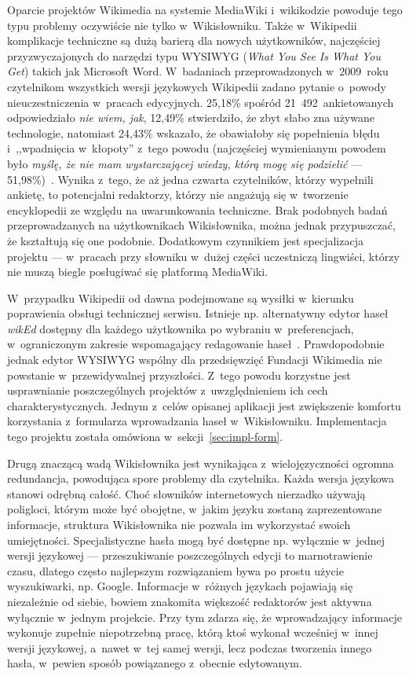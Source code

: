 Oparcie projektów Wikimedia na systemie MediaWiki i~wikikodzie powoduje tego typu problemy oczywiście nie tylko w~Wikisłowniku. Także w~Wikipedii komplikacje techniczne są dużą barierą dla nowych użytkowników, najczęściej przyzwyczajonych do narzędzi typu WYSIWYG (\emph{What You See Is What You Get}) takich jak Microsoft Word. W~badaniach przeprowadzonych w~2009~roku czytelnikom wszystkich wersji językowych Wikipedii zadano pytanie o~powody nieuczestniczenia w~pracach edycyjnych. 25,18\% spośród 21~492~ankietowanych odpowiedziało \emph{nie wiem, jak}, 12,49\% stwierdziło, że zbyt słabo zna używane technologie, natomiast 24,43\% wskazało, że obawiałoby się popełnienia błędu i~,,wpadnięcia w~kłopoty'' z~tego powodu (najczęściej wymienianym powodem było \emph{myślę, że nie mam wystarczającej wiedzy, którą mogę się podzielić} --- 51,98\%)~\cite{wiki:survey}. Wynika z~tego, że aż jedna czwarta czytelników, którzy wypełnili ankietę, to potencjalni redaktorzy, którzy nie angażują się w~tworzenie encyklopedii ze względu na uwarunkowania techniczne. Brak podobnych badań przeprowadzanych na użytkownikach Wikisłownika, można jednak przypuszczać, że kształtują się one podobnie. Dodatkowym czynnikiem jest specjalizacja projektu --- w~pracach przy słowniku w~dużej części uczestniczą lingwiści, którzy nie muszą biegle posługiwać się platformą MediaWiki.

W~przypadku Wikipedii od dawna podejmowane są wysiłki w~kierunku poprawienia obsługi technicznej serwisu. Istnieje np. alternatywny edytor haseł \emph{wikEd} dostępny dla każdego użytkownika po wybraniu w~preferencjach, w~ograniczonym zakresie wspomagający redagowanie haseł~\cite{wiki:wiked}. Prawdopodobnie jednak edytor WYSIWYG wspólny dla przedsięwzięć Fundacji Wikimedia nie powstanie w~przewidywalnej przyszłości. Z~tego powodu korzystne jest usprawnianie poszczególnych projektów z~uwzględnieniem ich cech charakterystycznych. Jednym z~celów opisanej aplikacji jest zwiększenie komfortu korzystania z~formularza wprowadzania haseł w~Wikisłowniku. Implementacja tego projektu została omówiona w~sekcji~\ref{sec:impl-form}.

Drugą znaczącą wadą Wikisłownika jest wynikająca z~wielojęzyczności ogromna redundancja, powodująca spore problemy dla czytelnika. Każda wersja językowa stanowi odrębną całość. Choć słowników internetowych nierzadko używają poligloci, którym może być obojętne, w~jakim języku zostaną zaprezentowane informacje, struktura Wikisłownika nie pozwala im wykorzystać swoich umiejętności. Specjalistyczne hasła mogą być dostępne np. wyłącznie w~jednej wersji językowej --- przeszukiwanie poszczególnych edycji to marnotrawienie czasu, dlatego często najlepszym rozwiązaniem bywa po prostu użycie wyszukiwarki, np. Google. Informacje w~różnych językach pojawiają się niezależnie od siebie, bowiem znakomita większość redaktorów jest aktywna wyłącznie w~jednym projekcie. Przy tym zdarza się, że wprowadzający informacje wykonuje zupełnie niepotrzebną pracę, którą ktoś wykonał wcześniej w~innej wersji językowej, a~nawet w~tej samej wersji, lecz podczas tworzenia innego hasła, w~pewien sposób powiązanego z~obecnie edytowanym.

